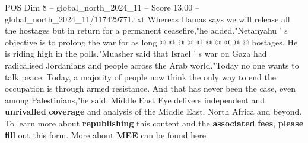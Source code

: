 \begin{textsample}{POS Dim 8 – global\_north\_2024\_11 – Score 13.00 – global\_north\_2024\_11/117429771.txt}
Whereas Hamas says we will release all the hostages but in return for a permanent ceasefire,"he added."Netanyahu ' s objective is to prolong the war for as long @ @ @ @ @ @ @ @ @ @ hostages.
He is riding high in the polls."Muasher said that Israel ' s war on Gaza had radicalised Jordanians and people across the Arab world."Today no one wants to talk peace.
Today, a majority of people now think the only way to end the occupation is through armed resistance.
And that has never been the case, even among Palestinians,"he said.
Middle East Eye delivers independent and \textbf{unrivalled} \textbf{coverage} and analysis of the Middle East, North Africa and beyond.
To learn more about \textbf{republishing} this content and the \textbf{associated} \textbf{fees}, \textbf{please} \textbf{fill} out this form.
More about \textbf{MEE} can be found here.

\end{textsample}
